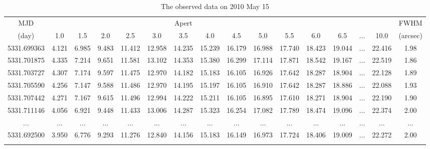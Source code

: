 \documentclass[structabstract]{raa}
\begin{document}
\begin{table}
\begin{center}
\begin{minipage}[]{100mm}
\caption[]{The observed data on 2010 May 15}
\label{Table2}
 \end{minipage}
 \setlength{\tabcolsep}{2.5pt}
\small
\begin{tabular}{cccccccccccccccc}
\hline\noalign{\smallskip}
  MJD  &   &   &   &  & &  Apert &    &    &   &  & &   &   &   &  FWHM  \\ \cline{2-15}

  (day)  &1.0  & 1.5  &2.0   & 2.5 &  3.0  & 3.5   & 4.0  & 4.5   &5.0   &5.5 & 6.0 & 6.5 & ...  & 10.0& (arcsec)  \\

\hline\noalign{\smallskip}
5331.699363  & 4.121  & 6.985  & 9.483  &11.412  &12.958  &14.235  &15.239  &16.179  &16.988  &17.740  &18.423  &19.044  & ...  &22.416  & 1.98  \\
5331.701875  & 4.335  & 7.214  & 9.651  &11.581  &13.102  &14.353  &15.380  &16.299  &17.114  &17.871  &18.542  &19.167  & ...  &22.519  & 1.86  \\
5331.703727  & 4.307  & 7.174  & 9.597  &11.475  &12.970  &14.182  &15.183  &16.105  &16.926  &17.642  &18.287  &18.904  & ...  &22.128  & 1.89  \\
5331.705590  & 4.256  & 7.147  & 9.588  &11.486  &12.970  &14.195  &15.197  &16.105  &16.910  &17.642  &18.287  &18.886  & ...  &22.088  & 1.93  \\
5331.707442  & 4.271  & 7.167  & 9.615  &11.496  &12.994  &14.222  &15.211  &16.105  &16.895  &17.610  &18.271  &18.904  & ...  &22.190  & 1.90  \\
5331.711146  & 4.056  & 6.921  & 9.448  &11.433  &13.006  &14.287  &15.323  &16.254  &17.082  &17.789  &18.474  &19.096  & ...  &22.374  & 2.00  \\
 ...          & ...    & ...    & ...    & ...    & ...    & ...    & ...    & ...    & ...    & ...    & ...    & ...    & ...    & ... & ...   \\
5331.692500  & 3.950  & 6.776  & 9.293  &11.276  &12.840  &14.156  &15.183  &16.149  &16.973  &17.724  &18.406  &19.009  & ...  &22.272  & 2.00 \\
\noalign{\smallskip}\hline
\end{tabular}
\end{center}
\end{table}
\end{document}
